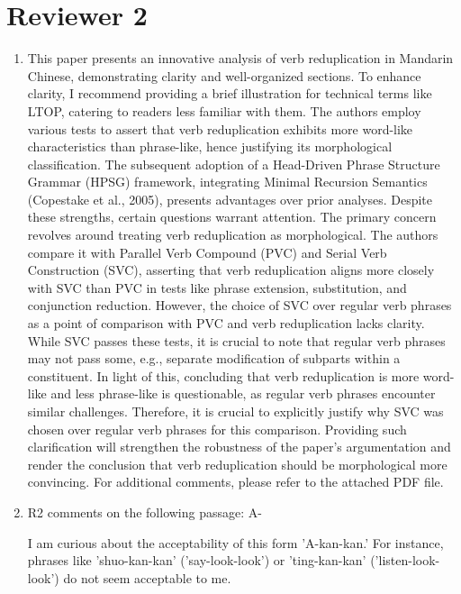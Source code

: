 \documentclass[fleqn,twoside]{article}
\begin{document}
\section{Reviewer 2}
\begin{enumerate}
\item
This paper presents an innovative analysis of verb reduplication in Mandarin Chinese, demonstrating
clarity and well-organized sections. To enhance clarity, I recommend providing a brief illustration for
technical terms like LTOP, catering to readers less familiar with them.
The authors employ various tests to assert that verb reduplication exhibits more word-like
characteristics than phrase-like, hence justifying its morphological classification. The subsequent
adoption of a Head-Driven Phrase Structure Grammar (HPSG) framework, integrating Minimal
Recursion Semantics (Copestake et al., 2005), presents advantages over prior analyses.
Despite these strengths, certain questions warrant attention. The primary concern revolves around
treating verb reduplication as morphological. The authors compare it with Parallel Verb Compound
(PVC) and Serial Verb Construction (SVC), asserting that verb reduplication aligns more closely with
SVC than PVC in tests like phrase extension, substitution, and conjunction reduction. However, the
choice of SVC over regular verb phrases as a point of comparison with PVC and verb reduplication
lacks clarity. While SVC passes these tests, it is crucial to note that regular verb phrases may not pass
some, e.g., separate modification of subparts within a constituent.
In light of this, concluding that verb reduplication is more word-like and less phrase-like is
questionable, as regular verb phrases encounter similar challenges. Therefore, it is crucial to
explicitly justify why SVC was chosen over regular verb phrases for this comparison. Providing such
clarification will strengthen the robustness of the paper's argumentation and render the conclusion
that verb reduplication should be morphological more convincing.
For additional comments, please refer to the attached PDF file.


\item
R2 comments on the following passage: A-

I am curious about the acceptability of this form 'A-kan-kan.' For instance, phrases like 'shuo-kan-kan' ('say-look-look') or 'ting-kan-kan' ('listen-look-look') do not seem acceptable to me. 


\end{enumerate}
\end{document}

